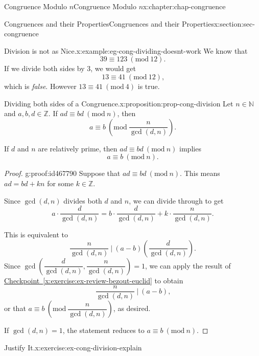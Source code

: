 \documentclass[oneside,10pt,]{book}
\newcommand{\xreffont}{\relax}
\numberwithin{equation}{section}
\newcommand{\Mod}[1]{\ \left(\mathrm{mod}\ #1\right)}
\begin{document}
\begin{chapterptx}{Congruence Modulo \(n\)}{}{Congruence Modulo \(n\)}{}{}{x:chapter:chap-congruence}
\begin{sectionptx}{Congruences and their Properties}{}{Congruences and their Properties}{}{}{x:section:sec-congruence}
\begin{example}{Division is not as Nice.}{x:example:eg-cong-dividing-doesnt-work}
We know that%
\begin{equation*}
39 \equiv 123 \Mod{12}\text{.}
\end{equation*}
If we divide both sides by 3, we would get%
\begin{equation*}
13 \equiv 41 \Mod{12}\text{,}
\end{equation*}
which is \emph{false}. However \(13 \equiv 41 \Mod{4}\) is true.%
\end{example}
\begin{proposition}{Dividing both sides of a Congruence.}{}{x:proposition:prop-cong-division}%
Let \(n \in \mathbb{N}\) and \(a,b,d \in \mathbb{Z}\). If \(ad \equiv bd \Mod{n}\), then%
\begin{equation*}
a \equiv b \Mod{\dfrac{n}{\gcd(d,n)}}\text{.}
\end{equation*}
%
\par
If \(d\) and \(n\) are relatively prime, then \(ad \equiv bd \Mod{n}\) implies%
\begin{equation*}
a \equiv b \Mod{n}\text{.}
\end{equation*}
%
\end{proposition}
\begin{proof}{}{g:proof:id467790}
Suppose that \(ad \equiv bd \Mod{n}\). This means \(ad = bd + kn\) for some \(k \in \mathbb{Z}\).%
\par
Since \(\gcd(d,n)\) divides both \(d\) and \(n\), we can divide through to get%
\begin{equation*}
a\cdot \dfrac{d}{\gcd(d,n)} = b\cdot \dfrac{d}{\gcd(d,n)} + k \cdot\dfrac{n}{\gcd(d,n)}\text{.}
\end{equation*}
%
\par
This is equivalent to%
\begin{equation*}
\dfrac{n}{\gcd(d,n)} \ \Biggl\vert \ (a-b)\left(\dfrac{d}{\gcd(d,n)}\right)\text{.}
\end{equation*}
Since \(\gcd\left(\dfrac{d}{\gcd(d,n)},\dfrac{n}{\gcd(d,n)}\right) = 1\), we can apply the result of \hyperref[x:exercise:ex-review-bezout-euclid]{Checkpoint~{\xreffont\ref{x:exercise:ex-review-bezout-euclid}}} to obtain%
\begin{equation*}
\dfrac{n}{\gcd(d,n)} \ \Biggl\vert \ (a-b)\text{,}
\end{equation*}
or that \(a \equiv b \Mod{\dfrac{n}{\gcd(d,n)}}\), as desired.%
\par
If \(\gcd(d,n) = 1\), the statement reduces to \(a \equiv b \Mod{n}\).%
\end{proof}
\begin{inlineexercise}{Justify It.}{x:exercise:ex-cong-division-explain}%

\end{inlineexercise}
\end{sectionptx}
\end{chapterptx}
\end{document}
